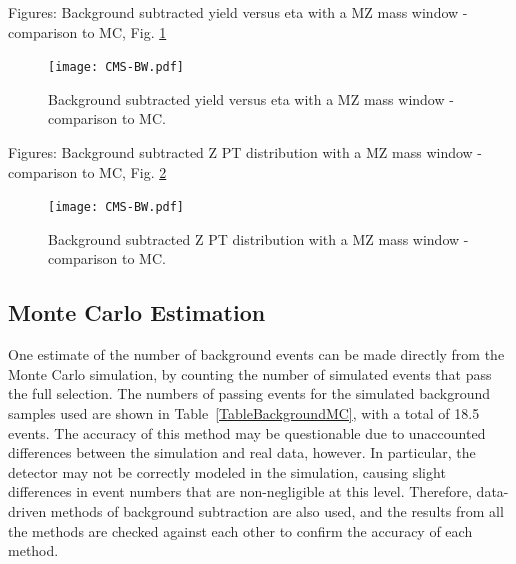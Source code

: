 Figures: Background subtracted yield versus eta with a MZ mass window - comparison to MC, Fig. \ref{fig:YieldVsZEtaComparedToMC}

 \begin{figure}[htb]
  \begin{center}
    \texttt{[image: CMS-BW.pdf]}
  \end{center}
  \caption[Background subtracted yield versus eta with a MZ mass window - comparison to MC]{Background subtracted yield versus eta with a MZ mass window - comparison to MC.}
  \label{fig:YieldVsZEtaComparedToMC}
 \end{figure}

Figures: Background subtracted Z PT distribution with a MZ mass window - comparison to MC, Fig. \ref{fig:YieldVsZPtComparedToMC}

 \begin{figure}[htb]
  \begin{center}
    \texttt{[image: CMS-BW.pdf]}
  \end{center}
  \caption[Background subtracted Z PT distribution with a MZ mass window - comparison to MC]{Background subtracted Z PT distribution with a MZ mass window - comparison to MC.}
  \label{fig:YieldVsZPtComparedToMC}
 \end{figure}

\subsection{Monte Carlo Estimation}
\label{anMeth:BGSubMC}
One estimate of the number of background events can be made 
directly from the Monte Carlo simulation, 
by counting the number of simulated events that pass 
the full selection.  
The numbers of passing events for the simulated background 
samples used are shown in Table~\ref{TableBackgroundMC}, 
with a total of 18.5 events.  
The accuracy of this method may be questionable due to 
unaccounted differences between the simulation and real data, however.  
In particular, 
the detector may not be correctly modeled in the simulation, 
causing slight differences in event numbers 
that are non-negligible at this level.  
Therefore, data-driven methods of background subtraction 
are also used, 
and the results from all the methods are checked against each other 
to confirm the accuracy of each method.  


